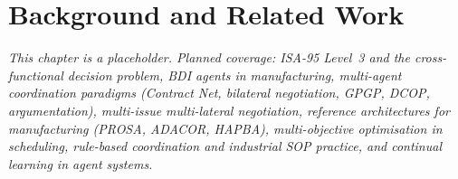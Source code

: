 \chapter{Background and Related Work}
\label{ch:literature}

\textit{This chapter is a placeholder. Planned coverage: ISA-95
Level~3 and the cross-functional decision problem, BDI agents in
manufacturing, multi-agent coordination paradigms (Contract Net,
bilateral negotiation, GPGP, DCOP, argumentation), multi-issue
multi-lateral negotiation, reference architectures for manufacturing
(PROSA, ADACOR, HAPBA), multi-objective optimisation in scheduling,
rule-based coordination and industrial SOP practice, and continual
learning in agent systems.}
